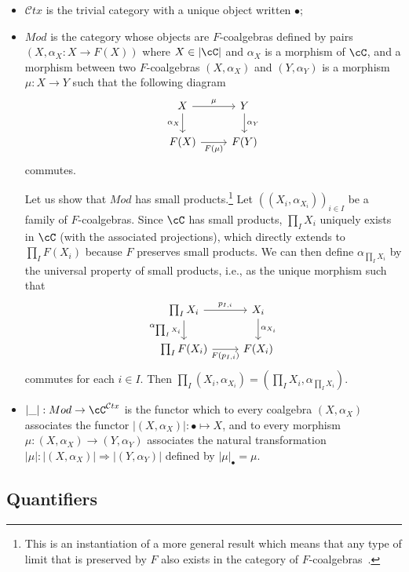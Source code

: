 \documentclass[preprint,3p,times]{elsarticle}
\newcommand{\Ctx}{\mathcal{C}tx}
\begin{document}
\begin{itemize}
	\item $\Ctx$ is the trivial category with a unique object written $\bullet$; 
	\item $Mod$ is the category whose objects are $F$-coalgebras defined by pairs $(X,\alpha_X : X \to F(X))$ where $X \in |\cC|$ and $\alpha_X$ is a morphism of $\cC$, and a morphism between two $F$-coalgebras $(X,\alpha_X)$ and $(Y,\alpha_Y)$ is a morphism $\mu : X \to Y$ such that the following diagram 
    \[\begin{tikzcd}
    	X & Y \\
    	{F(X)} & {F(Y)}
    	\arrow["\mu", from=1-1, to=1-2]
    	\arrow["{\alpha_Y}", from=1-2, to=2-2]
    	\arrow["{\alpha_X}"', from=1-1, to=2-1]
    	\arrow["{F(\mu)}"', from=2-1, to=2-2]
    \end{tikzcd}\]
commutes.

\medskip
Let us show that $Mod$ has small products.\footnote{This is an instantiation of a more general result which means that any type of limit that is preserved by $F$ also exists in the category of $F$-coalgebras~\cite{Rut00}.}
Let $((X_i, \alpha_{X_i}))_{i \in I}$ be a family of $F$-coalgebras. Since \(\cC\) has small products, \(\prod_I X_i\) uniquely exists in \(\cC\) (with the associated projections), which directly extends to \(\prod_I F(X_i)\) because $F$ preserves small products. We can then define \(\alpha_{\prod_I X_i}\) by the universal property of small products, i.e., as the unique morphism such that
\[\begin{tikzcd}
    	\prod_I X_i & X_i \\
    	{\prod_I F(X_i)} & {F(X_i)}
    	\arrow["p_{I,i}", from=1-1, to=1-2]
    	\arrow["{\alpha_{X_i}}", from=1-2, to=2-2]
    	\arrow["{\alpha_{\prod_I X_i}}"', from=1-1, to=2-1]
    	\arrow["{F(p_{I,i})}"', from=2-1, to=2-2]
    \end{tikzcd}\]
commutes for each \(i \in I\). Then \(\prod_I(X_i,\alpha_{X_i}) = (\prod_I X_i, \alpha_{\prod_I X_i})\).

	\item $|\_| : Mod \to \cC^{\Ctx}$ is the functor which to every coalgebra $(X,\alpha_X)$ associates the functor $|(X,\alpha_X)| : \bullet \mapsto X$, and to every morphism $\mu : (X,\alpha_X) \to (Y,\alpha_Y)$ associates the natural transformation $|\mu| : |(X,\alpha_X)| \Rightarrow |(Y,\alpha_Y)|$ defined by $|\mu|_\bullet = \mu$.
\end{itemize}

\subsection{Quantifiers}
\end{document}
